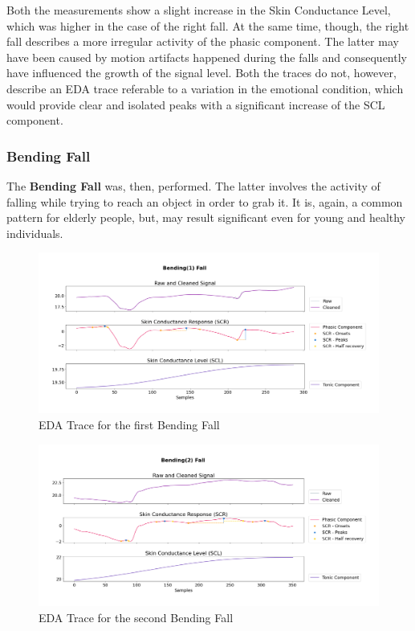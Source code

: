 Both the measurements show a slight increase in the Skin Conductance Level, which was higher in the case of the right fall. At the same time, though, the right fall describes a more irregular activity of the phasic component. The latter may have been caused by motion artifacts happened during the falls and consequently have influenced the growth of the signal level. Both the traces do not, however, describe an EDA trace referable to a variation in the emotional condition, which would provide clear and isolated peaks with a significant increase of the SCL component.

\subsubsection{Bending Fall}\label{subsubsec:bending-fall}

The \textbf{Bending Fall} was, then, performed. The latter involves the activity of falling while trying to reach an object in order to grab it. It is, again, a common pattern for elderly people, but, may result significant even for young and healthy individuals.

\vspace{10mm}

\begin{figure}[h!]
    \centering
    \includegraphics[width=\textwidth]{./images/movisens/Bending1.png}
    \caption{EDA Trace for the first Bending Fall}
    \label{fig:movisens-bending1}
\end{figure}

\begin{figure}[h!]
    \centering
    \includegraphics[width=\textwidth]{./images/movisens/Bending2.png}
    \caption{EDA Trace for the second Bending Fall}
    \label{fig:movisens-bending2}
\end{figure}

